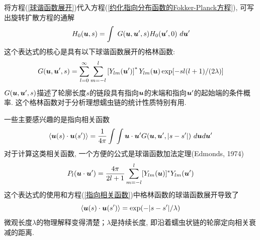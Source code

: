将方程(\ref{球谐函数展开})代入方程(\ref{约化指向分布函数的Fokker-Planck方程}), 可写出旋转扩散方程的通解
\begin{equation}
H_0(\bu,s)=\int \ G(\bu,\bu',s)H_0(\bu',0)\ d\bu'
\end{equation}
这个表达式的核心是具有以下球谐函数展开的格林函数:\\
\begin{equation}
G(\bm{u},\bm{u}',s) = \sum_{l=0}^{\infty}\sum_{m=-l}^{l}\left[Y_{lm}(\bm{u}')\right]^*Y_{lm}(\bm{u})\exp[-sl(l+1)/(2\lambda)]
\end{equation}
$G(\bm{u},\bm{u}',s)$描述了轮廓长度$s$的链段具有指向$\bm{u}$的末端和指向$\bm{u}'$的起始端的条件概率. 这个格林函数对于分析理想蠕虫链的统计性质特别有用. 

一些主要感兴趣的是指向相关函数\\
\begin{equation}
	\langle \bm{u}(s)\cdot \bm{u}(s')\rangle =\frac{1}{4\pi}\int \int \bm{u}\cdot \bm{u}'G(\bm{u},\bm{u}',|s-s'|)\ d\bm{u} d\bm{u}'\label{指向相关函数}
\end{equation}
对于计算这类相关函数, 一个方便的公式是球谐函数加法定理(Edmonds, 1974)\\
\begin{equation}
P_l(\bm{u}\cdot \bm{u}')=\frac{4\pi}{2l+1}\sum_{m=-l}^{l}[Y_{lm}(\bm{u})]^*Y_{lm}(\bm{u}')
\end{equation}
这个表达式的使用和方程(\ref{指向相关函数})中格林函数的球谐函数展开导致了\\
\begin{equation}
	\langle \bm{u}(s) \cdot \bm{u}(s')\rangle=\exp(-|s-s'|/\lambda)\label{简化的指向相关函数}
\end{equation}
微观长度$λ$的物理解释变得清楚；$λ$是持续长度, 即沿着蠕虫状链的轮廓定向相关衰减的距离. \\

